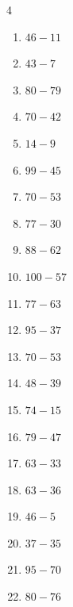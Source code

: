 \begin{multicols}{4}
\begin{enumerate}
  \item $46-11$
        \phantom{$=35$}

  \item $43-7$
        \phantom{$=36$}

  \item $80-79$
        \phantom{$=1$}

  \item $70-42$
        \phantom{$=28$}

  \item $14-9$
        \phantom{$=5$}

  \item $99-45$
        \phantom{$=54$}

  \item $70-53$
        \phantom{$=17$}

  \item $77-30$
        \phantom{$=47$}

\columnbreak %

  \item $88-62$
        \phantom{$=26$}

  \item $100-57$
        \phantom{$=43$}

  \item $77-63$
        \phantom{$=14$}

  \item $95-37$
        \phantom{$=58$}

  \item $70-53$
        \phantom{$=17$}

  \item $48-39$
        \phantom{$=9$}

  \item $74-15$
        \phantom{$=59$}

  \item $79-47$
        \phantom{$=32$}

  \item $63-33$
        \phantom{$=30$}

  \item $63-36$
        \phantom{$=27$}

  \item $46-5$
        \phantom{$=41$}

  \item $37-35$
        \phantom{$=2$}

  \item $95-70$
        \phantom{$=25$}

  \item $80-76$
        \phantom{$=4$}


\end{enumerate}
\end{multicols}
